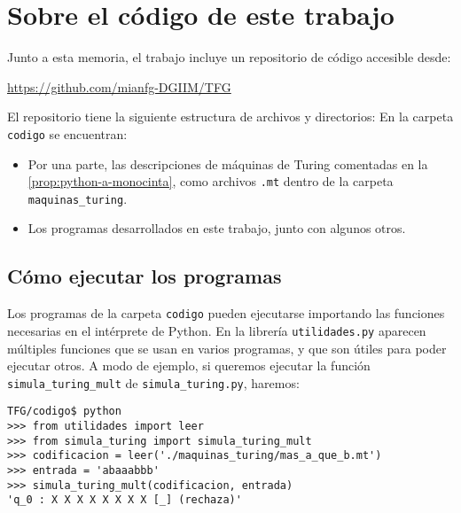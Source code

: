 
\chapter{Sobre el código de este trabajo}\label{ap:codigo-trabajo}

Junto a esta memoria, el trabajo incluye un repositorio de código accesible desde:
\begin{adjustwidth}{30pt}{}
    \href{https://github.com/mianfg-DGIIM/TFG}{https://github.com/mianfg-DGIIM/TFG}
\end{adjustwidth}
El repositorio tiene la siguiente estructura de archivos y directorios:
\vspace{8pt}
\vspace{8pt}
En la carpeta \texttt{codigo} se encuentran:
\begin{itemize}
    \item Por una parte, las descripciones de máquinas de Turing comentadas en la \cref{prop:python-a-monocinta}, como archivos \texttt{.mt} dentro de la carpeta \texttt{maquinas\_turing}.
    \item Los programas desarrollados en este trabajo, junto con algunos otros.
\end{itemize}

\section{Cómo ejecutar los programas}

Los programas de la carpeta \texttt{codigo} pueden ejecutarse importando las funciones necesarias en el intérprete de Python. En la librería \texttt{utilidades.py} aparecen múltiples funciones que se usan en varios programas, y que son útiles para poder ejecutar otros. A modo de ejemplo, si queremos ejecutar la función \texttt{simula\_turing\_mult} de \texttt{simula\_turing.py}, haremos:
\begin{lstlisting}[numbers=none,frame=none]
TFG/codigo$ python
>>> from utilidades import leer
>>> from simula_turing import simula_turing_mult
>>> codificacion = leer('./maquinas_turing/mas_a_que_b.mt')
>>> entrada = 'abaaabbb'
>>> simula_turing_mult(codificacion, entrada)
'q_0 : X X X X X X X X [_] (rechaza)'
\end{lstlisting}

